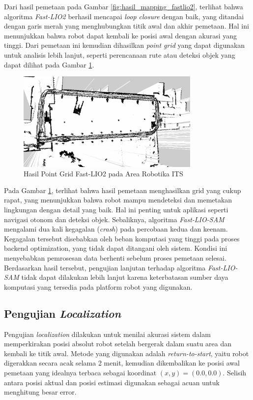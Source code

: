 Dari hasil pemetaan pada Gambar \ref{fig:hasil_mapping_fastlio2}, terlihat bahwa algoritma \emph{Fast-LIO2} berhasil mencapai \emph{loop closure} dengan baik, yang ditandai dengan garis merah yang menghubungkan titik awal dan akhir pemetaan. Hal ini menunjukkan bahwa robot dapat kembali ke posisi awal dengan akurasi yang tinggi. Dari pemetaan ini kemudian dihasilkan \emph{point grid} yang dapat digunakan untuk analisis lebih lanjut, seperti perencanaan rute atau deteksi objek yang dapat dilihat pada Gambar \ref{fig:point_grid_fastlio2}.
\begin{figure}[H]
	\centering
	\includegraphics[width=0.8\textwidth]{gambar/bab3/pgm.png}
	\caption{Hasil Point Grid Fast-LIO2 pada Area Robotika ITS}
	\label{fig:point_grid_fastlio2}
\end{figure}

Pada Gambar \ref{fig:point_grid_fastlio2}, terlihat bahwa hasil pemetaan menghasilkan grid yang cukup rapat, yang menunjukkan bahwa robot mampu mendeteksi dan memetakan lingkungan dengan detail yang baik. Hal ini penting untuk aplikasi seperti navigasi otonom dan deteksi objek. Sebaliknya, algoritma \emph{Fast-LIO-SAM} mengalami dua kali kegagalan (\emph{crash}) pada percobaan kedua dan keenam. Kegagalan tersebut disebabkan oleh beban komputasi yang tinggi pada proses backend optimization, yang tidak dapat ditangani oleh sistem. Kondisi ini menyebabkan pemrosesan data berhenti sebelum proses pemetaan selesai. Berdasarkan hasil tersebut, pengujian lanjutan terhadap algoritma \emph{Fast-LIO-SAM} tidak dapat dilakukan lebih lanjut karena keterbatasan sumber daya komputasi yang tersedia pada platform robot yang digunakan.




\subsection{Pengujian \emph{Localization}}
Pengujian \emph{localization} dilakukan untuk menilai akurasi sistem dalam memperkirakan posisi absolut robot setelah bergerak dalam suatu area dan kembali ke titik awal. Metode yang digunakan adalah \emph{return-to-start}, yaitu robot digerakkan secara acak selama 2 menit, kemudian dikembalikan ke posisi awal pemetaan yang idealnya terbaca sebagai koordinat $(x, y) = (0.0, 0.0)$. Selisih antara posisi aktual dan posisi estimasi digunakan sebagai acuan untuk menghitung besar error.

